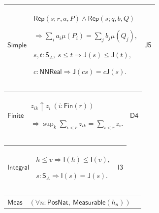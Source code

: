 \documentclass[11pt]{amsart}
\newlength{\FTCThreeColumnBody}
\begin{document}
{\begin{tabular}{|@{}>{\centering\arraybackslash}m{0.251968\FTCThreeColumnBody}|>{\centering\arraybackslash}m{0.590551\FTCThreeColumnBody}|>{\centering\arraybackslash}m{0.157480\FTCThreeColumnBody}|}
\hypertarget{lem:Simple}{$\displaystyle \textsf{Simple}$} & $\displaystyle \textsf{Rep}(s;r,a,P)\land\textsf{Rep}(s;q,b,Q)$\par
$\displaystyle \Rightarrow\sum_i a_i\mu(P_i)=\sum_j b_j\mu(Q_j),$\par
$\displaystyle s,t:\textsf{S}_A,\ s\le t\Rightarrow\textsf{J}(s)\le\textsf{J}(t),$\par
$\displaystyle c:\textsf{NNReal}\Rightarrow\textsf{J}(cs)=c\textsf{J}(s).$ & \hyperlink{proof:J5}{$\displaystyle \textsf{J5}$}\\ \hline
\end{tabular}%
\par\setlength{\parskip}{0pt}\nointerlineskip
\noindent
\begin{tabular}{|@{}>{\centering\arraybackslash}m{0.251968\FTCThreeColumnBody}|>{\centering\arraybackslash}m{0.590551\FTCThreeColumnBody}|>{\centering\arraybackslash}m{0.157480\FTCThreeColumnBody}|}\hline
\hypertarget{lem:Finite}{$\displaystyle \textsf{Finite}$} & $\displaystyle z_{ik}\uparrow z_i\ (i:\textsf{Fin}(r))$\par
$\displaystyle \Rightarrow\sup_k\sum_{i<r}z_{ik}=\sum_{i<r}z_i.$ & \hyperlink{proof:D4}{$\displaystyle \textsf{D4}$}\\ \hline
\end{tabular}%
\par\setlength{\parskip}{0pt}\nointerlineskip
\noindent
\begin{tabular}{|@{}>{\centering\arraybackslash}m{0.251968\FTCThreeColumnBody}|>{\centering\arraybackslash}m{0.590551\FTCThreeColumnBody}|>{\centering\arraybackslash}m{0.157480\FTCThreeColumnBody}|}\hline
\hypertarget{lem:Integral}{$\displaystyle \textsf{Integral}$} & $\displaystyle h\le v\Rightarrow\textsf{I}(h)\le\textsf{I}(v),$\par
$\displaystyle s:\textsf{S}_A\Rightarrow\textsf{I}(s)=\textsf{J}(s).$ & \hyperlink{proof:I3}{$\displaystyle \textsf{I3}$}\\ \hline
\end{tabular}%
\par\setlength{\parskip}{0pt}\nointerlineskip
\noindent
\begin{tabular}{|@{}>{\centering\arraybackslash}m{0.251968\FTCThreeColumnBody}|>{\centering\arraybackslash}m{0.590551\FTCThreeColumnBody}|>{\centering\arraybackslash}m{0.157480\FTCThreeColumnBody}|}\hline
\hypertarget{lem:Meas}{$\displaystyle \textsf{Meas}$} & $\displaystyle (\forall n:\textsf{PosNat},\ \textsf{Measurable}(h_n))$\par

\end{tabular}}
\end{document}
